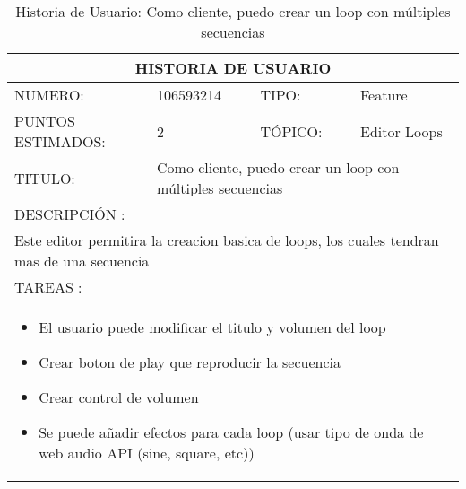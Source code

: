 \begin{table}[h]
\centering
\renewcommand{\arraystretch}{1.4}
\begin{tabular}{|*{4}{l|}}
\hline
\multicolumn{4}{|c|}{HISTORIA DE USUARIO} \\ \hline
NUMERO: & 106593214 & TIPO: & Feature \\ \hline
PUNTOS ESTIMADOS: & 2 & TÓPICO: & Editor Loops \\ \hline
TITULO: & \multicolumn{3}{|p{7.2cm}|}{Como cliente, puedo crear un loop con múltiples secuencias} \\ \hline
\multicolumn{4}{|l|}{DESCRIPCIÓN : } \\ \hline
\multicolumn{4}{|p{11cm}|}{Este editor permitira la creacion basica de loops, los cuales tendran mas de una secuencia} \\ \hline
\multicolumn{4}{|l|}{TAREAS : } \\ \hline
\multicolumn{4}{|p{11cm}|}{
\begin{minipage}[t]{\hsize}
  \begin{itemize}
    \item El usuario puede modificar el titulo y volumen del loop
    \item Crear boton de play que reproducir la secuencia
    \item Crear control de volumen
    \item Se puede añadir efectos para cada loop (usar tipo de onda de web audio API (sine, square, etc))
  \end{itemize}
\end{minipage}
} \\ \hline
\end{tabular}
\caption{Historia de Usuario: Como cliente, puedo crear un loop con múltiples secuencias}
\label{tab:Primero}
\end{table}

